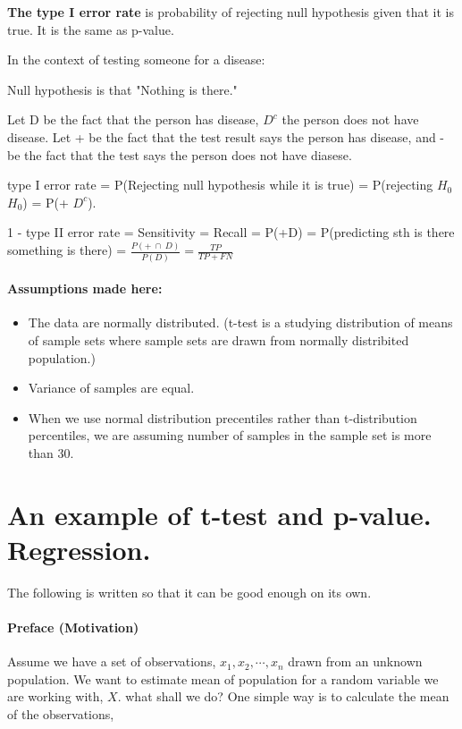 \documentclass[11pt]{article}
\providecommand{\tightlist}{%
      \setlength{\itemsep}{0pt}\setlength{\parskip}{0pt}}
\begin{document}
\textbf{The type I error rate} is probability of rejecting null
hypothesis given that it is true. It is the same as p-value.

    In the context of testing someone for a disease:

Null hypothesis is that "Nothing is there."

Let D be the fact that the person has disease, $D^c$ the person does
not have disease. Let + be the fact that the test result says the person
has disease, and - be the fact that the test says the person does not
have diasese.

type I error rate = P(Rejecting null hypothesis while it is true) =
P(rejecting $H_0$ \textbar{} $H_0$) = P(+ \textbar{} $D^c$).

1 - type II error rate = Sensitivity = Recall = P(+\textbar{}D) =
P(predicting sth is there \textbar{} something is there) =
$\frac{P(+ \: \cap \: D)}{P(D)} = \frac{TP}{TP + FN}$

    \paragraph{Assumptions made here:}\label{assumpstions-made-here}

\begin{itemize}
\tightlist
\item
  The data are normally distributed. (t-test is a studying distribution
  of means of sample sets where sample sets are drawn from normally
  distribited population.)
\item
  Variance of samples are equal.
\item
  When we use normal distribution precentiles rather than t-distribution
  percentiles, we are assuming number of samples in the sample set is
  more than 30.
\end{itemize}

\section{{An example of t-test and p-value. Regression.}}

The following is written so that it can be good enough on its own.
    \paragraph{Preface (Motivation)}\label{preface-motivation}

Assume we have a set of observations, $x_1, x_2, \cdots, x_n$ drawn
from an unknown population. We want to estimate mean of population for a
random variable we are working with, $X$. what shall we do? One simple
way is to calculate the mean of the observations,
\end{document}

